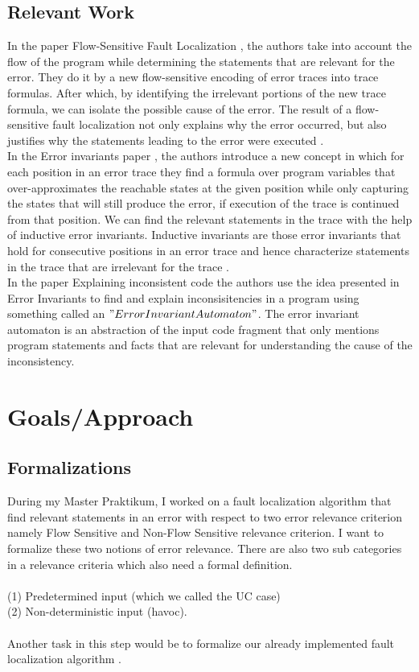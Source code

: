 \documentclass{article}
\begin{document}
\subsection{Relevant Work}
In the paper Flow-Sensitive Fault Localization \cite{faultlocalization}, the authors take into account the flow of the program while determining the statements that are relevant for the error. They do it by a new flow-sensitive encoding of error traces into trace formulas. After which, by identifying the irrelevant portions of the new trace formula, we can isolate the possible cause of the error. The result of a flow-sensitive fault localization not only explains why the error occurred, but also justifies why the statements leading to the error were executed \cite{faultlocalization}.\\
In the Error invariants paper \cite{errorinvariants}, the authors introduce a new concept in which for each position in an error trace they find a formula over program variables that over-approximates the reachable states at the given position while only capturing the states that will still produce the error, if execution of the trace is continued from that position. We can find the relevant statements in the trace with the help of inductive error invariants. Inductive invariants are those error invariants that hold for consecutive positions in an error trace and hence characterize statements in the trace that are irrelevant for the trace \cite{errorinvariants}. \\
In the paper Explaining inconsistent code \cite{inconsistentcode} the authors use the idea presented in Error Invariants to find and explain inconsisitencies in a program using something called an $"Error Invariant Automaton"$. The error invariant automaton is an abstraction of the input code fragment that only mentions program statements and facts that are relevant for understanding the cause of the inconsistency. \\

\section{Goals/Approach}
\subsection{Formalizations}
During my Master Praktikum, I worked on a fault localization algorithm that find relevant statements in an error with respect to two error relevance criterion namely Flow Sensitive and Non-Flow Sensitive relevance criterion. I want to formalize these two notions of error relevance. There are also two sub categories in a relevance criteria which also need a formal definition.\\ 
\\(1) Predetermined input (which we called the UC case) 
\\ (2) Non-deterministic input (havoc).\\
\\Another task in this step would be to formalize our already implemented fault localization algorithm .
\end{document}

